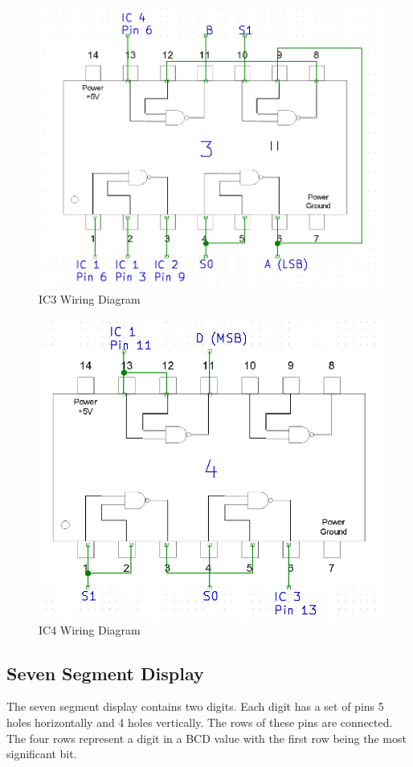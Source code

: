 \documentclass[11pt,a4paper]{article}
\begin{document}
\begin{figure}[H]
    \centering
    \includegraphics[width=5in]{IC3.png}
    \caption{IC3 Wiring Diagram}
\end{figure}
\begin{figure}[H]
    \centering
    \includegraphics[width=5in]{IC4.png}
    \caption{IC4 Wiring Diagram}
\end{figure}
\subsection{Seven Segment Display}
The seven segment display contains two digits. Each digit has a set of pins 5 holes horizontally
and 4 holes vertically. The rows of these pins are connected. The four rows represent a digit
in a BCD value with the first row being the most significant bit.
\end{document}
